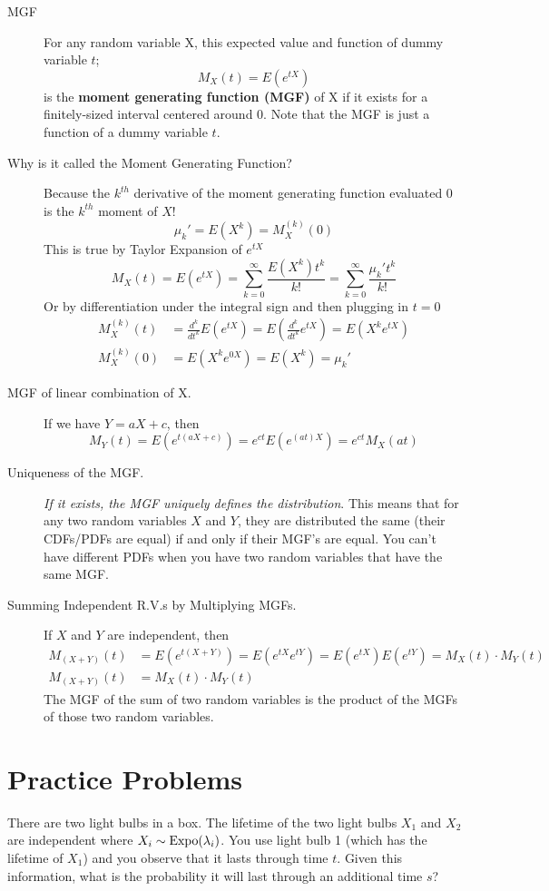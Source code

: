 \documentclass[11pt]{article}
\begin{document}
\begin{description}
  \item[MGF] For any random variable X, this expected value and function of dummy variable $t$;
    \[ M_X(t) = E(e^{tX}) \]
    is the \textbf{moment generating function (MGF)} of X if it exists for a finitely-sized interval centered around 0. Note that the MGF is just a function of a dummy variable $t$.
  \item[Why is it called the Moment Generating Function?] Because the $k^{th}$ derivative of the moment generating function evaluated 0 is the $k^{th}$ moment of $X$!
  \[\mu_k' = E(X^k) = M_X^{(k)}(0)\]
  This is true by Taylor Expansion of $e^{tX}$
  \[M_X(t) = E(e^{tX}) = \sum_{k=0}^\infty \frac{E(X^k)t^k}{k!} = \sum_{k=0}^\infty \frac{\mu_k't^k}{k!} \]
  Or by differentiation under the integral sign and then plugging in $t=0$
  \begin{align*}
    M_X^{(k)}(t) &= \frac{d^k}{dt^k}E(e^{tX}) = E(\frac{d^k}{dt^k}e^{tX}) = E(X^ke^{tX}) \\
    M_X^{(k)}(0) &= E(X^ke^{0X}) = E(X^k) = \mu_k'
  \end{align*}

  \item[MGF of linear combination of X.] If we have $Y = aX + c$, then
    \[M_Y(t) = E(e^{t(aX + c)}) =  e^{ct}E(e^{(at)X}) = e^{ct}M_X(at)\]


  \item[Uniqueness of the MGF.] \emph{If it exists, the MGF uniquely defines the distribution}. This means that for any two random variables $X$ and $Y$, they are distributed the same (their CDFs/PDFs are equal) if and only if their MGF's are equal. You can't have different PDFs when you have two random variables that have the same MGF.
  \item[Summing Independent R.V.s by Multiplying MGFs.] If $X$ and $Y$ are independent, then
  \begin{align*}
    M_{(X+Y)}(t) &= E(e^{t(X + Y)}) = E(e^{tX}e^{tY}) = E(e^{tX})E(e^{tY}) = M_X(t) \cdot M_Y(t) \\
    M_{(X+Y)}(t) &= M_X(t) \cdot M_Y(t)
  \end{align*}
  The MGF of the sum of two random variables is the product of the MGFs of those two random variables.
\end{description}

\section*{Practice Problems}
\begin{exercise}
There are two light bulbs in a box. The lifetime of the two light bulbs $X_1$ and $X_2$ are independent where $X_i \sim \textrm{Expo}(\lambda_i)$. You use light bulb 1 (which has the lifetime of $X_1$) and you observe that it lasts through time $t$. Given this information, what is the probability it will last through an additional time $s$?
\end{exercise}
\end{document}
